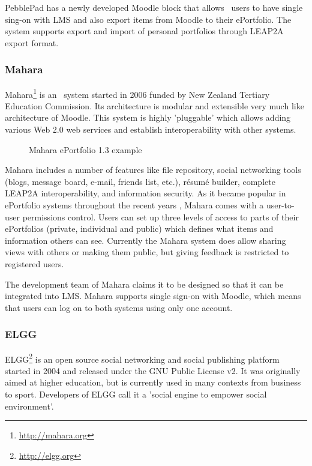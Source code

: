 PebblePad has a newly developed Moodle block that allows \ep~users to
have single sing-on with LMS and also export items from Moodle to their
ePortfolio. The system supports export and import of personal portfolios through
LEAP2A export format.
 
\subsubsection{Mahara}
Mahara\footnote{\url{http://mahara.org}} is an \ep~system started in 2006
funded by New Zealand Tertiary Education Commission. Its architecture is modular
and extensible very much like architecture of Moodle. This system is highly
'pluggable' which allows adding various Web 2.0 web services and establish
interoperability with other systems.

\begin{figure}[htb]
\centering
\setlength\fboxsep{0pt}
\setlength\fboxrule{0.5pt}
\caption{Mahara ePortfolio 1.3 example}
\label{fig:maharaep}
\end{figure}

Mahara includes a number of features like file repository, social networking
tools (blogs, message board, e-mail, friends list, etc.), résumé builder,
complete LEAP2A interoperability, and information security. As it became popular
in ePortfolio systems throughout the recent years \citep{Waters2009},
Mahara comes with a user-to-user permissions control. Users can set up three
levels of access to parts of their ePortfolios (private, individual and public)
which defines what items and information others can see. Currently the Mahara
system does allow sharing views with others or making them public, but giving
feedback is restricted to registered users. 

The development team of Mahara claims it to be designed so that it can be
integrated into LMS. Mahara supports single sign-on with Moodle, which means
that users can log on to both systems using only one account.

\subsubsection{ELGG}
ELGG\footnote{\url{http://elgg.org}} is an open source social networking and
social publishing platform started in 2004 and released under the GNU Public
License v2. It was originally aimed at higher education, but is currently used
in many contexts from business to sport. Developers of ELGG call it a 'social
engine to empower social environment'.

